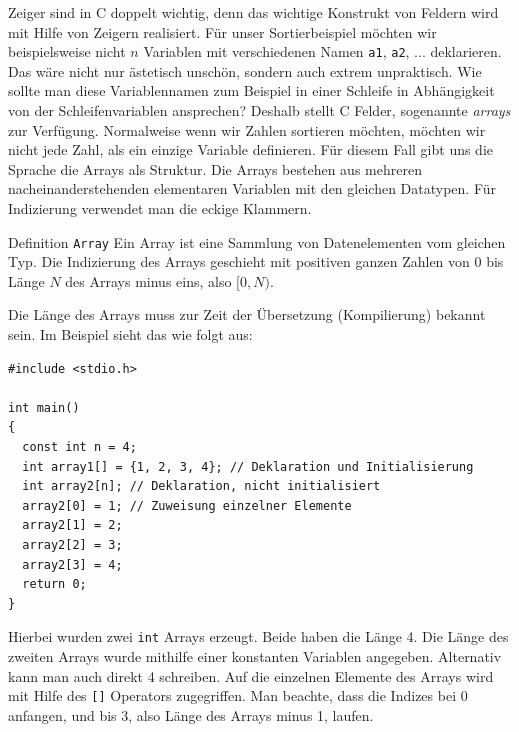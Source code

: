 Zeiger sind in C doppelt wichtig, denn das wichtige Konstrukt von Feldern wird mit Hilfe von Zeigern realisiert.
Für unser Sortierbeispiel möchten wir beispielsweise nicht $n$ Variablen mit verschiedenen Namen \verb|a1|, \verb|a2|, ... deklarieren.
Das wäre nicht nur ästetisch unschön, sondern auch extrem unpraktisch.
Wie sollte man diese Variablennamen zum Beispiel in einer Schleife in Abhängigkeit von der Schleifenvariablen ansprechen?
Deshalb stellt C Felder, sogenannte \emph{arrays} zur Verfügung.
Normalweise wenn wir Zahlen sortieren möchten, möchten wir nicht jede Zahl, als
ein einzige Variable definieren. Für diesem Fall gibt uns die Sprache die Arrays
als Struktur. Die Arrays bestehen aus mehreren nacheinanderstehenden elementaren
Variablen mit den gleichen Datatypen. Für Indizierung verwendet man
die eckige Klammern.

\begin{myblock}{Definition \texttt{Array}}
    Ein Array ist eine Sammlung von Datenelementen vom gleichen Typ. Die
    Indizierung des Arrays geschieht mit positiven ganzen Zahlen von 0 bis
    Länge $N$ des Arrays minus eins, also $[0, N)$.
\end{myblock}

Die Länge des Arrays muss zur Zeit der Übersetzung (Kompilierung) bekannt sein.
Im Beispiel sieht das wie folgt aus:
\begin{lstlisting}
#include <stdio.h>

int main()
{
  const int n = 4;
  int array1[] = {1, 2, 3, 4}; // Deklaration und Initialisierung
  int array2[n]; // Deklaration, nicht initialisiert
  array2[0] = 1; // Zuweisung einzelner Elemente
  array2[1] = 2;
  array2[2] = 3;
  array2[3] = 4;
  return 0;
}
\end{lstlisting}
Hierbei wurden zwei \texttt{int} Arrays erzeugt.
Beide haben die Länge 4.
Die Länge des zweiten Arrays wurde mithilfe einer konstanten Variablen angegeben.
Alternativ kann man auch direkt 4 schreiben.
Auf die einzelnen Elemente des Arrays wird mit Hilfe des \verb|[]| Operators zugegriffen.
Man beachte, dass die Indizes bei $0$ anfangen, und bis $3$, also Länge des Arrays minus 1, laufen.

